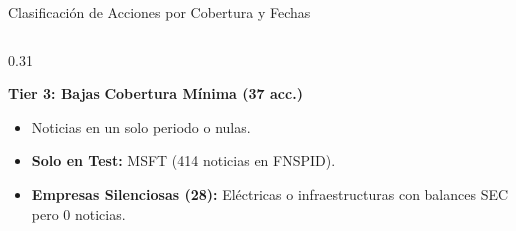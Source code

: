 \documentclass[aspectratio=169,11pt]{beamer}
\begin{document}
\begin{frame}{Clasificación de Acciones por Cobertura y Fechas}
\begin{columns}[T]
        \begin{column}{0.31\textwidth}
            \begin{block}{\textbf{\color{GrayTier} Tier 3: Bajas}}
                \textbf{Cobertura Mínima (37 acc.)}
                \begin{itemize}
                    \item Noticias en un solo periodo o nulas.
                    \item \textbf{Solo en Test:} MSFT (414 noticias en FNSPID).
                    \item \textbf{Empresas Silenciosas (28):} Eléctricas o infraestructuras con balances SEC pero 0 noticias.
                \end{itemize}
            \end{block}
        \end{column}
    \end{columns}
\end{frame}
\end{document}
